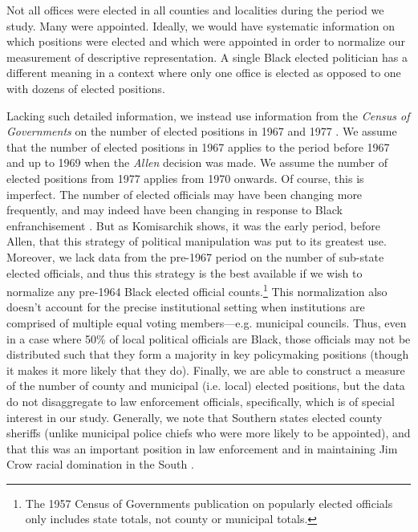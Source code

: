 \documentclass[12pt]{article}
\begin{document}
Not all offices were elected in all counties and localities during the period we study.  Many were appointed.  Ideally, we would have systematic information on which positions were elected and which were appointed in order to normalize our measurement of descriptive representation.  A single Black elected politician has a different meaning in a context where only one office is elected as opposed to one with dozens of elected positions.

Lacking such detailed information, we instead use information from the \emph{Census of Governments} on the number of elected positions in 1967 and 1977 .  We assume that the number of elected positions in 1967 applies to the period before 1967 and up to 1969 when the \emph{Allen} decision was made.  We assume the number of elected positions from 1977 applies from 1970 onwards.  Of course, this is imperfect.  The number of elected officials may have been changing more frequently, and may indeed have been changing in response to Black enfranchisement .  But as Komisarchik shows, it was the early period, before Allen, that this strategy of political manipulation was put to its greatest use.  Moreover, we lack data from the pre-1967 period on the number of sub-state elected officials, and thus this strategy is the best available if we wish to normalize any pre-1964 Black elected official counts.\footnote{The 1957 Census of Governments publication on popularly elected officials only includes state totals, not county or municipal totals.}  This normalization also doesn't account for the precise institutional setting when institutions are comprised of multiple equal voting members---e.g. municipal councils.  Thus, even in a case where 50\% of local political officials are Black, those officials may not be distributed such that they form a majority in key policymaking positions (though it makes it more likely that they do). Finally, we are able to construct a measure of the number of county and municipal (i.e. local) elected positions, but the data do not disaggregate to law enforcement officials, specifically, which is of special interest in our study.  Generally, we note that Southern states elected county sheriffs (unlike municipal police chiefs who were more likely to be appointed), and that this was an important position in law enforcement and in maintaining Jim Crow racial domination in the South .
\end{document}
